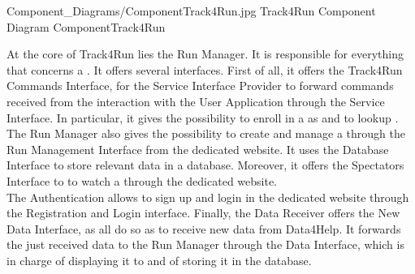 \documentclass[../../DD.tex]{subfiles}
\begin{document}
	\image {13cm} {Component_Diagrams/ComponentTrack4Run.jpg} {Track4Run Component Diagram} {ComponentTrack4Run}

	At the core of Track4Run lies the Run Manager. It is responsible for everything that concerns a . It offers several interfaces. First of all, it offers the Track4Run Commands Interface, for the Service Interface Provider to forward commands received from the interaction with the User Application through the Service Interface. In particular, it gives  the possibility to enroll in a  as  and to lookup . The Run Manager also gives  the possibility to create and manage a  through the Run Management Interface from the  dedicated website. It uses the Database Interface to store relevant data in a database. Moreover, it offers the Spectators Interface to  to watch a  through the  dedicated website.\\
	The Authentication allows  to sign up and login in the dedicated website through the Registration and Login interface.
	Finally, the Data Receiver offers the New Data Interface, as all  do so as to receive new data from Data4Help. It forwards the just received data to the Run Manager through the Data Interface, which is in charge of displaying it to  and of storing it in the database.
	
\end{document}
